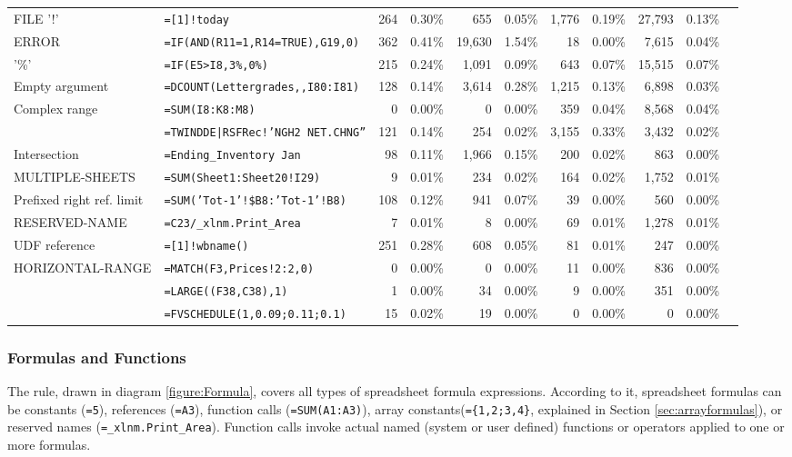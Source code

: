 \documentclass[conference]{IEEEtran}
\begin{document}
\begin{table*}
\begin{tabular}{llrrrrrrrrr}
		FILE '!' & \texttt{=[1]!today} & 264 & 0.30\% & 655 & 0.05\% & 1,776 & 0.19\% & 27,793 & 0.13\%\\
		ERROR & \texttt{=IF(AND(R11=1,R14=TRUE),G19,0)} & 362 & 0.41\% & 19,630 & 1.54\% & 18 & 0.00\% & 7,615 & 0.04\%\\
		'\%' & \texttt{=IF(E5>I8,3\%,0\%)} & 215 & 0.24\% & 1,091 & 0.09\% & 643 & 0.07\% & 15,515 & 0.07\%\\
		Empty argument & \texttt{=DCOUNT(Lettergrades,,I80:I81)} & 128 & 0.14\% & 3,614 & 0.28\% & 1,215 & 0.13\% & 6,898 & 0.03\%\\
		Complex range & \texttt{=SUM(I8:K8:M8)} & 0 & 0.00\% & 0 & 0.00\% & 359 & 0.04\% & 8,568 & 0.04\%\\
		\synt{DynamicDataExchange} & \texttt{=TWINDDE|RSFRec!'NGH2 NET.CHNG''} & 121 & 0.14\% & 254 & 0.02\% & 3,155 & 0.33\% & 3,432 & 0.02\%\\
		Intersection & \texttt{=Ending_Inventory Jan} & 98 & 0.11\% & 1,966 & 0.15\% & 200 & 0.02\% & 863 & 0.00\%\\
		MULTIPLE-SHEETS & \texttt{=SUM(Sheet1:Sheet20!I29)} & 9 & 0.01\% & 234 & 0.02\% & 164 & 0.02\% & 1,752 & 0.01\%\\
		Prefixed right ref. limit & \texttt{=SUM('Tot-1'!\$B8:'Tot-1'!B8)} & 108 & 0.12\% & 941 & 0.07\% & 39 & 0.00\% & 560 & 0.00\%\\
		RESERVED-NAME & \texttt{=C23/_xlnm.Print_Area} & 7 & 0.01\% & 8 & 0.00\% & 69 & 0.01\% & 1,278 & 0.01\%\\
		UDF reference & \texttt{=[1]!wbname()} & 251 & 0.28\% & 608 & 0.05\% & 81 & 0.01\% & 247 & 0.00\%\\
		HORIZONTAL-RANGE & \texttt{=MATCH(F3,Prices!2:2,0)} & 0 & 0.00\% & 0 & 0.00\% & 11 & 0.00\% & 836 & 0.00\%\\
		\synt{Union} & \texttt{=LARGE((F38,C38),1)} & 1 & 0.00\% & 34 & 0.00\% & 9 & 0.00\% & 351 & 0.00\%\\
		\synt{ConstantArray} & \texttt{=FVSCHEDULE(1,{0.09;0.11;0.1})} & 15 & 0.02\% & 19 & 0.00\% & 0 & 0.00\% & 0 & 0.00\%\\
		\hline
		
	\end{tabular}
\end{table*}

\subsubsection{Formulas and Functions}

The  rule, drawn in diagram \ref{figure:Formula}, covers all types of spreadsheet formula expressions. According to it, spreadsheet formulas can be constants (\texttt{=5}), references (\texttt{=A3}), function calls (\texttt{=SUM(A1:A3)}), array constants(\texttt{=\{1,2;3,4\}}, explained in Section \ref{sec:arrayformulas}), or reserved names (\texttt{=_xlnm.Print_Area}). Function calls invoke actual named (system or user defined) functions or operators applied to one or more formulas. 
\end{document}
